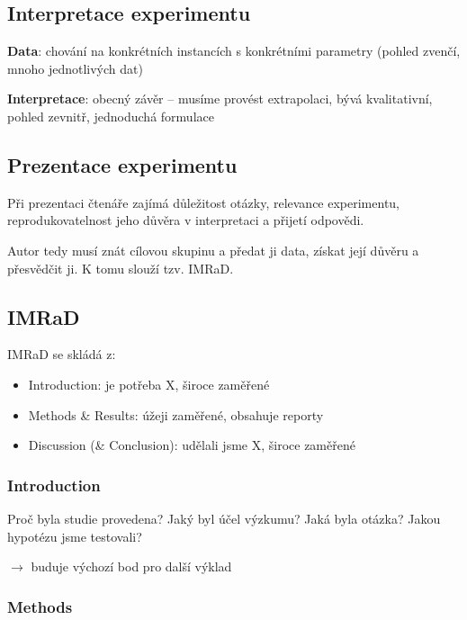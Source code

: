 \subsection{Interpretace experimentu}

\textbf{Data}: chování na konkrétních instancích s konkrétními parametry (pohled zvenčí, mnoho jednotlivých dat)

\vspace{4pt}
\noindent \textbf{Interpretace}: obecný závěr -- musíme provést extrapolaci, bývá kvalitativní, pohled zevnitř, jednoduchá formulace

\subsection{Prezentace experimentu}

Při prezentaci čtenáře zajímá důležitost otázky, relevance experimentu, reprodukovatelnost jeho důvěra v interpretaci a přijetí odpovědi.

Autor tedy musí znát cílovou skupinu a předat ji data, získat její důvěru a přesvědčit ji. K tomu slouží tzv. IMRaD.

\subsection{IMRaD}

IMRaD se skládá z:

\begin{itemize}
    \item Introduction: je potřeba X, široce zaměřené
    \item Methods \& Results: úžeji zaměřené, obsahuje reporty
    \item Discussion (\& Conclusion): udělali jsme X, široce zaměřené
\end{itemize}

\subsubsection{Introduction}

Proč byla studie provedena? Jaký byl účel výzkumu? Jaká byla otázka? Jakou hypotézu jsme testovali?

$\to$ buduje výchozí bod pro další výklad

\subsubsection{Methods}

